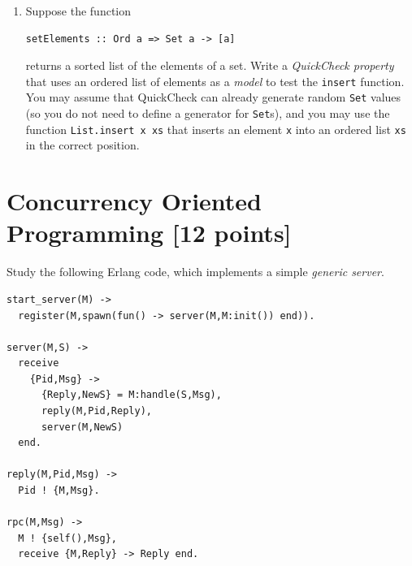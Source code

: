 \documentclass{article}
\begin{document}
\begin{enumerate}
\begin{enumerate}
\item
Suppose the function
\begin{verbatim}
setElements :: Ord a => Set a -> [a]
\end{verbatim}
returns a sorted list of the elements of a set. Write a {\em
  QuickCheck property} that uses an ordered list of elements as a {\em
  model} to test the \verb!insert! function.  You may assume that
QuickCheck can already generate random \verb!Set! values (so you do
not need to define a generator for \verb!Set!s), and you may use the
function \verb!List.insert x xs! that inserts an element \verb!x! into
an ordered list \verb!xs! in the correct position.  



\end{enumerate}




\end{enumerate}

\newpage
\section{Concurrency Oriented Programming [12 points]}

Study the following Erlang code, which implements a simple {\em generic server}.
\begin{verbatim}
start_server(M) ->
  register(M,spawn(fun() -> server(M,M:init()) end)).

server(M,S) ->
  receive
    {Pid,Msg} ->
      {Reply,NewS} = M:handle(S,Msg),
      reply(M,Pid,Reply),
      server(M,NewS)
  end.

reply(M,Pid,Msg) ->
  Pid ! {M,Msg}.

rpc(M,Msg) ->
  M ! {self(),Msg},
  receive {M,Reply} -> Reply end.
\end{verbatim}
\end{document}

